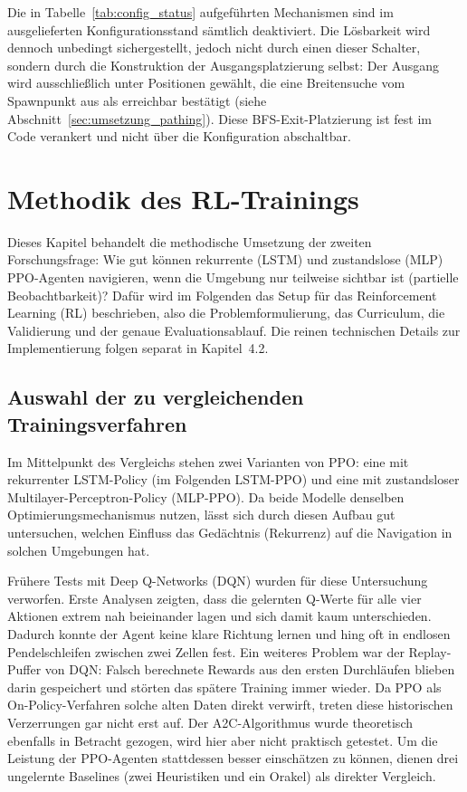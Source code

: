 \documentclass[
  a4paper,
  11pt,
  twoside,
  BCOR=8mm,           %
  headings=big,
  numbers=noenddot,
  listof=totoc,       %
  captions=tableheading,
]{scrreprt}
\begin{document}
Die in Tabelle~\ref{tab:config_status} aufgeführten Mechanismen sind im ausgelieferten Konfigurationsstand sämtlich deaktiviert. Die Lösbarkeit wird dennoch unbedingt sichergestellt, jedoch nicht durch einen dieser Schalter, sondern durch die Konstruktion der Ausgangsplatzierung selbst: Der Ausgang wird ausschließlich unter Positionen gewählt, die eine Breitensuche vom Spawnpunkt aus als erreichbar bestätigt (siehe Abschnitt~\ref{sec:umsetzung_pathing}). Diese BFS-Exit-Platzierung ist fest im Code verankert und nicht über die Konfiguration abschaltbar.
\section{Methodik des RL-Trainings}
\label{sec:methodik_rl}

Dieses Kapitel behandelt die methodische Umsetzung der zweiten Forschungsfrage: Wie gut können rekurrente (LSTM) und zustandslose (MLP) PPO-Agenten navigieren, wenn die Umgebung nur teilweise sichtbar ist (partielle Beobachtbarkeit)? Dafür wird im Folgenden das Setup für das Reinforcement Learning (RL) beschrieben, also die Problemformulierung, das Curriculum, die Validierung und der genaue Evaluationsablauf. Die reinen technischen Details zur Implementierung folgen separat in Kapitel~4.2.

\subsection{Auswahl der zu vergleichenden Trainingsverfahren}
\label{sec:methodik_auswahl}

Im Mittelpunkt des Vergleichs stehen zwei Varianten von PPO: eine mit rekurrenter LSTM-Policy (im Folgenden LSTM-PPO) und eine mit zustandsloser Multilayer-Perceptron-Policy (MLP-PPO). Da beide Modelle denselben Optimierungsmechanismus nutzen, lässt sich durch diesen Aufbau gut untersuchen, welchen Einfluss das Gedächtnis (Rekurrenz) auf die Navigation in solchen Umgebungen hat. 

Frühere Tests mit Deep Q-Networks (DQN) wurden für diese Untersuchung verworfen. Erste Analysen zeigten, dass die gelernten Q-Werte für alle vier Aktionen extrem nah beieinander lagen und sich damit kaum unterschieden. Dadurch konnte der Agent keine klare Richtung lernen und hing oft in endlosen Pendelschleifen zwischen zwei Zellen fest. Ein weiteres Problem war der Replay-Puffer von DQN: Falsch berechnete Rewards aus den ersten Durchläufen blieben darin gespeichert und störten das spätere Training immer wieder. Da PPO als On-Policy-Verfahren solche alten Daten direkt verwirft, treten diese historischen Verzerrungen gar nicht erst auf. Der A2C-Algorithmus wurde theoretisch ebenfalls in Betracht gezogen, wird hier aber nicht praktisch getestet. Um die Leistung der PPO-Agenten stattdessen besser einschätzen zu können, dienen drei ungelernte Baselines (zwei Heuristiken und ein Orakel) als direkter Vergleich.
\end{document}
